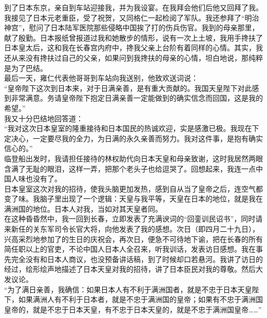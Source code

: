 到了日本东京，亲自到车站迎接我，并为我设宴。在我拜会他们后他又回拜了我。我接见了日本元老重臣，受了祝贺，又同格仁一起检阅了军队。我还参拜了“明治神宫”，慰问了日本陆军医院那些侵略中国挨了打的伤兵伤官。我到的母亲那里，献了殷勤。日本报纸曾报道过我和她散步的情形，说有一次上土坡，我用手搀扶了日本皇太后，这和我在长春宫内府中，搀我父亲上台阶有着同样的心情。其实，我还从来没有搀扶过自己的父亲，如果问到我搀扶的母亲的心情，坦白地说，那纯粹是为了巴结。\\

最后一天，雍仁代表他哥哥到车站向我送别，他致欢送词说：\\

“皇帝陛下这次到日本来，对于日满亲善，是有重大贡献的。我国天皇陛下对此感到非常满意。务请皇帝陛下抱定日满亲善一定能做到的确实信念而回国，这是我的希望。”\\

我又十分巴结地回答道：\\

“我对这次日本皇室的隆重接待和日本国民的热诚欢迎，实是感激已极。我现在下定决心，一定要尽我的全力，为日满的永久亲善而努力。我对这件事，是抱有确实信心的。”\\

临登船出发时，我请担任接待的林权助代向日本天皇和母亲致谢，这时我居然两眼含满了无耻的眼泪，这样一弄，把那个老头子也给逗哭了。回想起来，我连一点中国人味也没有了。\\

日本皇室这次对我的招待，使我头脑更加发热，感到自从当了皇帝之后，连空气都变了味。我脑子里出现了一个逻辑：天皇与我平等，天皇在日本的地位，就是我在满洲国的地位。日本人对我，当如对其天皇者同。\\

在这种昏昏然中，我一回到长春，立即发表了充满谀词的“回銮训民诏书”，同时请来新任的关东军司令长官大将，向他发表了我的感想。次日（即四月二十九日），兴高采烈地参加了的生日的庆祝会，再次日，便急不可待地下谕，把在长春的所有简任职以上的官吏，不论中国人日本人全召来，听我训话，发表访日感想。我在事先完全没有和日本人商议，也没预备讲话稿，到了时候却口若悬河。我讲了访日的经过，绘形绘声地描述了日本天皇对我的招待，讲了日本臣民对我的尊敬。然后大发议论。\\

“为了满日亲善，我确信：如果日本人有不利于满洲国者，就是不忠于日本天皇陛下，如果满洲人有不利于日本者，就是不忠于满洲国的皇帝；如果有不忠于满洲国皇帝的，就是不忠于日本天皇，有不忠于日本天皇的，就是不忠于满洲国皇帝……”\\

